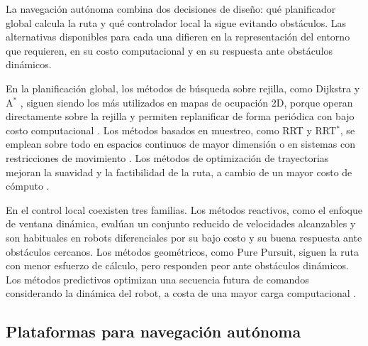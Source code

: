 La navegación autónoma combina dos decisiones de diseño: qué planificador
global calcula la ruta y qué controlador local la sigue evitando obstáculos.
Las alternativas disponibles para cada una difieren en la representación
del entorno que requieren, en su costo computacional y en su respuesta ante
obstáculos dinámicos.

En la planificación global, los métodos de búsqueda sobre rejilla, como
Dijkstra y A$^*$ \citep[Sec.~2.2.2]{lavalle2006planning}, siguen siendo los
más utilizados en mapas de ocupación 2D, porque operan directamente sobre la
rejilla y permiten replanificar de forma periódica con bajo costo
computacional \citep{macenski2023desks}. Los métodos basados en muestreo,
como RRT y RRT$^*$, se emplean sobre todo en espacios continuos de mayor
dimensión o en sistemas con restricciones de movimiento
\citep{lavalle2006planning,karaman2011optimal}. Los métodos de optimización de trayectorias
mejoran la suavidad y la factibilidad de la ruta, a cambio de un mayor costo
de cómputo \citep{macenski2023desks}.

En el control local coexisten tres familias. Los métodos reactivos, como el
enfoque de ventana dinámica, evalúan un conjunto reducido de velocidades
alcanzables y son habituales en robots diferenciales por su bajo costo y su
buena respuesta ante obstáculos cercanos. Los métodos geométricos, como Pure
Pursuit, siguen la ruta con menor esfuerzo de cálculo, pero responden peor
ante obstáculos dinámicos. Los métodos predictivos optimizan una secuencia
futura de comandos considerando la dinámica del robot, a costa de una mayor
carga computacional \citep{macenski2023desks}.

\subsection{Plataformas para navegación autónoma}
\label{sec:plataformas_nav}

